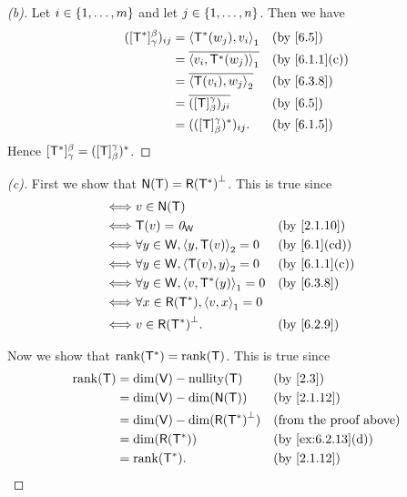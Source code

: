 \begin{proof}[(b)]
	Let \(i \in \left\lbrace1, \dots, m\right\rbrace\) and let \(j \in \left\lbrace1, \dots, n\right\rbrace\).
	Then we have
	\begin{align*}
		([\T^*]_{\gamma}^{\beta})_{i j} & = \inn{\T^*(w_j), v_i}_1               &  & \by{6.5}      \\
		                                & = \conj{\inn{v_i, \T^*(w_j)}_1}        &  & \by{6.1.1}[c] \\
		                                & = \conj{\inn{\T(v_i), w_j}_2}          &  & \by{6.3.8}    \\
		                                & = \conj{([\T]_{\beta}^{\gamma})_{j i}} &  & \by{6.5}      \\
		                                & = (([\T]_{\beta}^{\gamma})^*)_{i j}.   &  & \by{6.1.5}
	\end{align*}
	Hence \([\mathsf{T}^*]_{\gamma}^{\beta} = ([\mathsf{T}]_{\beta}^{\gamma})^*\).
\end{proof}

\begin{proof}[(c)]
	First we show that \(\ns{\T} = \rg{\T^*}^{\perp}\).
	This is true since
	\begin{align*}
		\iff & v \in \ns{\T}                                                \\
		\iff & \T(v) = \zv_{\W}                          &  & \by{2.1.10}   \\
		\iff & \forall y \in \W, \inn{y, \T(v)}_2 = 0    &  & \by{6.1}[cd]  \\
		\iff & \forall y \in \W, \inn{\T(v), y}_2 = 0    &  & \by{6.1.1}[c] \\
		\iff & \forall y \in \W, \inn{v, \T^*(y)}_1 = 0  &  & \by{6.3.8}    \\
		\iff & \forall x \in \rg{\T^*}, \inn{v, x}_1 = 0                    \\
		\iff & v \in \rg{\T^*}^{\perp}.                  &  & \by{6.2.9}
	\end{align*}

	Now we show that \(\rk{\T^*} = \rk{\T}\).
	This is true since
	\begin{align*}
		\rk{\T} & = \dim(\V) - \nt{\T}                 &  & \by{2.3}                      \\
		        & = \dim(\V) - \dim(\ns{\T})           &  & \by{2.1.12}                   \\
		        & = \dim(\V) - \dim(\rg{\T^*}^{\perp}) &  & \text{(from the proof above)} \\
		        & = \dim(\rg{\T^*})                    &  & \by{ex:6.2.13}[d]             \\
		        & = \rk{\T^*}.                         &  & \by{2.1.12}
	\end{align*}
\end{proof}

